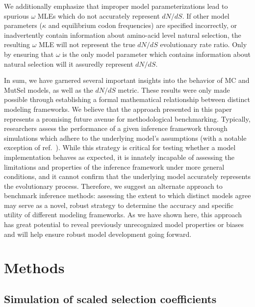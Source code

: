 \documentclass{pnastwo}
\begin{document}
\begin{article}
We additionally emphasize that improper model parameterizations lead to spurious $\omega$ MLEs which do not accurately represent $dN/dS$. If other model parameters ($\kappa$ and equilibrium codon frequencies) are specified incorrectly, or inadvertently contain information about amino-acid level natural selection, the resulting $\omega$ MLE will not represent the true $dN/dS$ evolutionary rate ratio. Only by ensuring that $\omega$ is the only model parameter which contains information about natural selection will it assuredly represent $dN/dS$. 
		
		
		
In sum, we have garnered several important insights into the behavior of MC and MutSel models, as well as the $dN/dS$ metric. These results were only made possible through establishing a formal mathematical relationship between distinct modeling frameworks. We believe that the approach presented in this paper represents a promising future avenue for methodological benchmarking. Typically, researchers assess the performance of a given inference framework through simulations which adhere to the underlying model's assumptions (with a notable exception of ref.\ \cite{Holder2008}). While this strategy is critical for testing whether a model implementation behaves as expected, it is innately incapable of assessing the limitations and properties of the inference framework under more general conditions, and it cannot confirm that the underlying model accurately represents the evolutionary process. Therefore, we suggest an alternate approach to benchmark inference methods: assessing the extent to which distinct models agree may serve as a novel, robust strategy to determine the accuracy and specific utility of different modeling frameworks. As we have shown here, this approach has great potential to reveal previously unrecognized model properties or biases and will help ensure robust model development going forward.
		
		
\section*{Methods}

\subsection*{Simulation of scaled selection coefficients}


\end{article}
\end{document}
